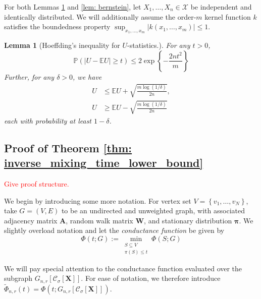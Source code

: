 \documentclass{article}
\newcommand{\set}[1]{\left\{#1\right\}}
\newcommand{\abs}[1]{\left \lvert #1 \right \rvert}
\newcommand{\1}{\mathbf{1}}
\newcommand{\pibf}{\bm{\pi}}
\newcommand{\Abf}{\mathbf{A}}
\newcommand{\Xbf}{\mathbf{X}}
\newcommand{\Wbf}{\mathbf{W}}
\newcommand{\Cset}{\mathcal{C}}
\newcommand{\Csig}{\Cset_{\sigma}}
\theoremstyle{aldenthm}
\newtheorem{lemma}{Lemma}
\begin{document}
For both Lemmas \ref{lem: bounded_difference} and \ref{lem: bernstein}, let $X_1, \ldots, X_n \in \mathcal{X}$ be independent and identically distributed. We will additionally assume the order-$m$ kernel function $k$ satisfies the boundedness property $\sup_{x_1, \ldots, x_m} \abs{k(x_1, \ldots, x_m)} \leq 1$. 

\begin{lemma}[Hoeffding's inequality for $U$-statistics.]
	\label{lem: bounded_difference}
	For any $t > 0$,
	\begin{equation*}
	\mathbb{P}(\abs{U - \mathbb{E}U} \geq t) \leq 2 \exp\left\{- \frac{2nt^2}{m}\right\}
	\end{equation*}
	Further, for any $\delta > 0$, we have
	\begin{align*}
	U & \leq \mathbb{E}U + \sqrt{\frac{m \log(1 / \delta)}{2n} }, \\
	U & \geq \mathbb{E}U - \sqrt{\frac{m \log(1 / \delta)}{2n} }
	\end{align*}
	each with probability at least $1 - \delta$. 
\end{lemma}

\subsection{Proof of Theorem \ref{thm: inverse_mixing_time_lower_bound}}

\textcolor{red}{Give proof structure.}

We begin by introducing some more notation. For vertex set $V = \set{v_1, \ldots, v_N}$, take $G = (V,E)$ to be an undirected and unweighted graph, with associated adjacency matrix $\Abf$, random walk matrix $\Wbf$, and stationary distribution $\pibf$. We slightly overload notation and let the \emph{conductance function} be given by
\begin{equation*}
\Phi(t; G) := \min_{\substack{S \subseteq V \\ \pi(S) \leq t} } \Phi(S; G)
\end{equation*}

We will pay special attention to the conductance function evaluated over the subgraph $G_{n,r}[\Csig[\Xbf]]$. For ease of notation, we therefore introduce $\widetilde{\Phi}_{n,r}(t) = \Phi(t; G_{n,r}[\Csig[\Xbf]])$. 
\end{document}
